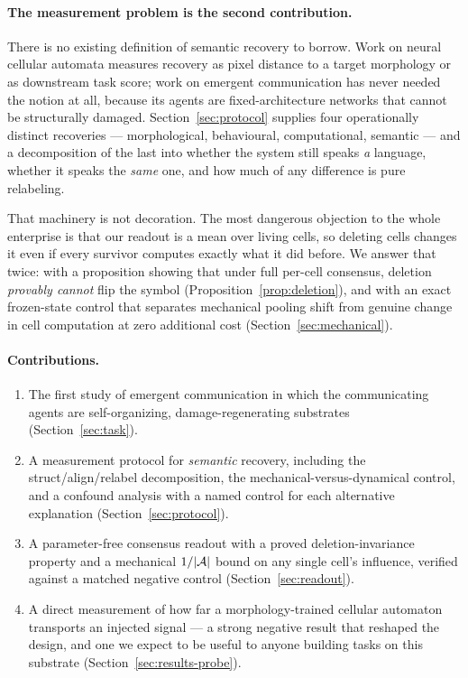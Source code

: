 \paragraph{The measurement problem is the second contribution.} There is no
existing definition of semantic recovery to borrow. Work on neural cellular
automata measures recovery as pixel distance to a target morphology or as
downstream task score; work on emergent communication has never needed the notion
at all, because its agents are fixed-architecture networks that cannot be
structurally damaged. Section~\ref{sec:protocol} supplies four operationally
distinct recoveries --- morphological, behavioural, computational, semantic ---
and a decomposition of the last into whether the system still speaks \emph{a}
language, whether it speaks the \emph{same} one, and how much of any difference
is pure relabeling.

That machinery is not decoration. The most dangerous objection to the whole
enterprise is that our readout is a mean over living cells, so deleting cells
changes it even if every survivor computes exactly what it did before. We answer
that twice: with a proposition showing that under full per-cell consensus,
deletion \emph{provably cannot} flip the symbol
(Proposition~\ref{prop:deletion}), and with an exact frozen-state control that
separates mechanical pooling shift from genuine change in cell computation at
zero additional cost (Section~\ref{sec:mechanical}).

\paragraph{Contributions.}
\begin{enumerate}\itemsep2pt
\item The first study of emergent communication in which the communicating
  agents are self-organizing, damage-regenerating substrates
  (Section~\ref{sec:task}).
\item A measurement protocol for \emph{semantic} recovery, including the
  struct/align/relabel decomposition, the mechanical-versus-dynamical control,
  and a confound analysis with a named control for each alternative explanation
  (Section~\ref{sec:protocol}).
\item A parameter-free consensus readout with a proved deletion-invariance
  property and a mechanical $1/|\mathcal{A}|$ bound on any single cell's influence,
  verified against a matched negative control (Section~\ref{sec:readout}).
\item A direct measurement of how far a morphology-trained cellular automaton
  transports an injected signal --- a strong negative result that reshaped the
  design, and one we expect to be useful to anyone building tasks on this
  substrate (Section~\ref{sec:results-probe}).
\end{enumerate}
